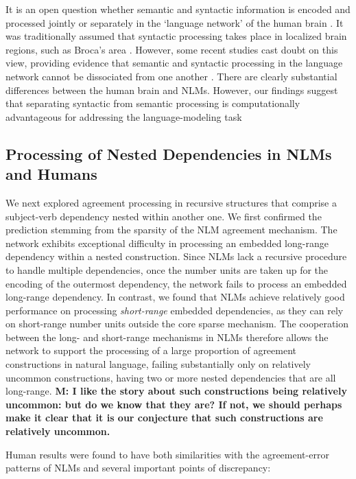It is an open question whether semantic and syntactic information is encoded and processed jointly or separately in the `language network' of the human brain \citep{pallier2011cortical}. It was traditionally assumed that syntactic processing takes place in localized brain regions, such as Broca's area \citep[e.g.,][]{dapretto1999form}. However, some recent studies cast doubt on this view, providing evidence that semantic and syntactic processing in the language network cannot be dissociated from one another \citep{mollica2018high, siegelman2019attempt, fedorenko2020lack}. There are clearly substantial differences between the human brain and NLMs. However, our findings suggest that separating syntactic from semantic processing is computationally advantageous for addressing the language-modeling task \citep[][for related studies.]{ullman2004contributions, o2006biologically, russin2019reilly} 

\subsection{Processing of Nested Dependencies in NLMs and Humans}
We next explored agreement processing in recursive structures that comprise a subject-verb dependency nested within another one. We first confirmed the prediction stemming from the sparsity of the NLM agreement mechanism. The network exhibits exceptional difficulty in processing an embedded long-range dependency within a nested construction. Since NLMs lack a recursive procedure to handle multiple dependencies, once the number units are taken up for the encoding of the outermost dependency, the network fails to process an embedded long-range dependency. In contrast, we found that NLMs achieve relatively good performance on processing \textit{short-range} embedded dependencies, as they can rely on short-range number units outside the core sparse mechanism. The cooperation between the long- and short-range mechanisms in NLMs therefore allows the network to support the processing of a large proportion of agreement constructions in natural language, failing substantially only on relatively uncommon constructions, having two or more nested dependencies that are all long-range. \textbf{M: I like the story about such constructions being relatively uncommon: but do we know that they are? If not, we should perhaps make it clear that it is our conjecture that such constructions are relatively uncommon.}

Human results were found to have both similarities with the agreement-error patterns of NLMs and several important points of discrepancy:

